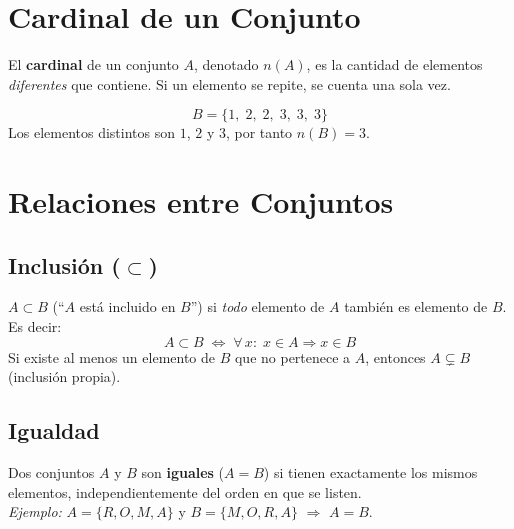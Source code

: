 \section{Cardinal de un Conjunto}

\begin{cajadef}
  El \textbf{cardinal} de un conjunto $A$, denotado $n(A)$, es la cantidad de
  elementos \emph{diferentes} que contiene. Si un elemento se repite, se cuenta
  una sola vez.
\end{cajadef}

\begin{cajaejemplo}[2]
  \[
    B = \{1,\; 2,\; 2,\; 3,\; 3,\; 3\}
  \]
  Los elementos distintos son $1$, $2$ y $3$, por tanto $n(B) = 3$.
\end{cajaejemplo}

\section{Relaciones entre Conjuntos}

\subsection{Inclusi\'on (\texorpdfstring{$\subset$}{⊂})}

\begin{cajadef}
  $A \subset B$ (``$A$ está incluido en $B$'') si \emph{todo} elemento de $A$
  también es elemento de $B$. Es decir:
  \[
    A \subset B \;\Longleftrightarrow\; \forall\, x:\; x \in A \Rightarrow x \in B
  \]
  Si existe al menos un elemento de $B$ que no pertenece a $A$, entonces
  $A \subsetneq B$ (inclusión propia).
\end{cajadef}

\subsection{Igualdad}

\begin{cajadef}
  Dos conjuntos $A$ y $B$ son \textbf{iguales} ($A = B$) si tienen exactamente
  los mismos elementos, independientemente del orden en que se listen.\\[4pt]
  \textit{Ejemplo:} $A = \{R, O, M, A\}$ y $B = \{M, O, R, A\}$ $\Rightarrow$
  $A = B$.
\end{cajadef}


